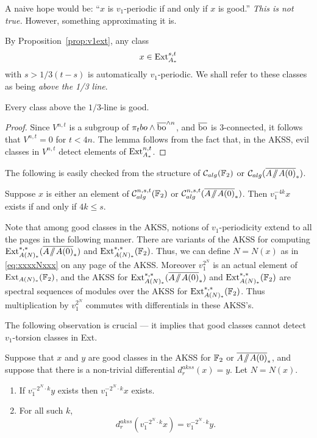 A naive hope would be: ``$x$ is $v_1$-periodic if and only if $x$ is good.''
\emph{This is not true.}  However, something approximating it is.

By Proposition~\ref{prop:v1ext}, any class 
$$ x \in \operatorname{Ext}^{s,t}_{A_*} $$
with $s > 1/3(t-s)$ is automatically $v_1$-periodic.  We shall refer to these classes as being \emph{above the 1/3 line}.

\begin{lem}\label{lem:onethird}
Every class above the $1/3$-line is good.
\end{lem}

\begin{proof}
Since $V^{n,t}$ is a subgroup of $\pi_t bo \wedge \overline{\mathrm{bo}}^{\wedge n}$, and $\overline{\mathrm{bo}}$ is $3$-connected, it follows that $V^{n,t} = 0$ for $t < 4n$.  The lemma follows from the fact that, in the AKSS, evil classes in $V^{n,t}$ detect elements of $\operatorname{Ext}^{n,t}_{A_*}$. 
\end{proof}

The following is easily checked from the structure of $\mathcal{C}_{alg}(\mathbb{F}_2)$ or $\mc{C}_{alg}(\AA0)$.
\begin{lem}\label{lem:v1div}
Suppose $x$ is either an element of $\mathcal{C}^{n,s,t}_{alg}(\mathbb{F}_2)$ or $\mc{C}^{n,s,t}_{alg}(\AA0)$.  Then $v_1^{-4k}x$ exists if and only if $4k \le s$.
\end{lem}



\begin{rmk} Note that among good classes in the AKSS, notions of $v_1$-periodicity extend to all the pages in the following manner. There are variants of the AKSS for computing $\Ext^{*,*}_{A(N)_*}(\AA0)$ and $\operatorname{Ext}^{*,*}_{A(N)_*}(\mathbb{F}_2)$. Thus, we can define $N=N(x)$ as in \eqref{eq:xxxxNxxx} on any page of the AKSS. Moreover $v_1^{2^N}$ is an actual element of $\operatorname{Ext}_{A(N)_*}(\mathbb{F}_2)$, and the AKSS for $\Ext^{*,*}_{A(N)_*}(\AA0)$ and  $\operatorname{Ext}^{*,*}_{A(N)_*}(\mathbb{F}_2)$ are spectral sequences of modules over the AKSS for $\operatorname{Ext}^{*,*}_{A(N)_*}(\mathbb{F}_2)$.  Thus multiplication by $v_1^{2^N}$ commutes with differentials in these AKSS's.
\end{rmk}


The following observation is crucial --- it implies that good classes cannot detect $v_1$-torsion classes in Ext.
\begin{lem}\label{lem:v1torsion}
Suppose that $x$ and $y$ are good classes in the AKSS for $\mathbb{F}_2$ or $\AA0$, and suppose that there is a non-trivial differential $d^{akss}_r(x) = y$.  Let $N = N(x)$.
\begin{enumerate}
\item If $v_1^{-2^N\cdot k} y$ exists then $v_1^{-2^N\cdot k}x$ exists.
\item For all such $k$, 
$$d_r^{akss}(v_1^{-2^N\cdot k}x) = v_1^{-2^N\cdot k}y. $$
\end{enumerate} 
\end{lem}

